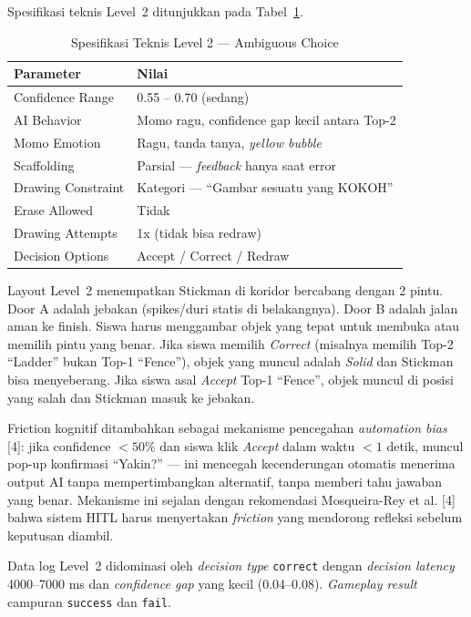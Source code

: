 Spesifikasi teknis Level~2 ditunjukkan pada Tabel~\ref{tab:level2-spec}.

\begin{table}[H]
\centering
\caption{Spesifikasi Teknis Level 2 --- Ambiguous Choice}
\label{tab:level2-spec}
\begin{tabular}{|l|l|}
\hline
\textbf{Parameter} & \textbf{Nilai} \\ \hline
Confidence Range & 0.55 -- 0.70 (sedang) \\ \hline
AI Behavior & Momo ragu, confidence gap kecil antara Top-2 \\ \hline
Momo Emotion & Ragu, tanda tanya, \textit{yellow bubble} \\ \hline
Scaffolding & Parsial --- \textit{feedback} hanya saat error \\ \hline
Drawing Constraint & Kategori --- ``Gambar sesuatu yang KOKOH'' \\ \hline
Erase Allowed & Tidak \\ \hline
Drawing Attempts & 1x (tidak bisa redraw) \\ \hline
Decision Options & Accept / Correct / Redraw \\ \hline
\end{tabular}
\end{table}

Layout Level~2 menempatkan Stickman di koridor bercabang dengan 2 pintu. Door A adalah jebakan (spikes/duri statis di belakangnya). Door B adalah jalan aman ke finish. Siswa harus menggambar objek yang tepat untuk membuka atau memilih pintu yang benar. Jika siswa memilih \textit{Correct} (misalnya memilih Top-2 ``Ladder'' bukan Top-1 ``Fence''), objek yang muncul adalah \textit{Solid} dan Stickman bisa menyeberang. Jika siswa asal \textit{Accept} Top-1 ``Fence'', objek muncul di posisi yang salah dan Stickman masuk ke jebakan.

Friction kognitif ditambahkan sebagai mekanisme pencegahan \textit{automation bias} [4]: jika confidence $< 50\%$ dan siswa klik \textit{Accept} dalam waktu $< 1$ detik, muncul pop-up konfirmasi ``Yakin?'' --- ini mencegah kecenderungan otomatis menerima output AI tanpa mempertimbangkan alternatif, tanpa memberi tahu jawaban yang benar. Mekanisme ini sejalan dengan rekomendasi Mosqueira-Rey et al. [4] bahwa sistem HITL harus menyertakan \textit{friction} yang mendorong refleksi sebelum keputusan diambil.

Data log Level~2 didominasi oleh \textit{decision type} \texttt{correct} dengan \textit{decision latency} 4000--7000 ms dan \textit{confidence gap} yang kecil (0.04--0.08). \textit{Gameplay result} campuran \texttt{success} dan \texttt{fail}.

